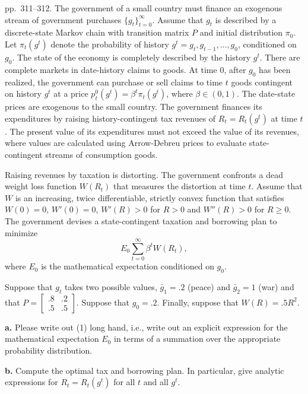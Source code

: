\documentclass[12pt, letterpaper]{article}
\begin{document}
\begin{tcolorbox}[evenbox,title={Exercise 8.8 \quad Optimal taxation}]
\begin{tcolorbox}[questionbox]
pp.~311--312. The government of a small country must finance an exogenous stream of government purchases
$\{g_t\}_{t=0}^\infty$. Assume that $g_t$ is described by a discrete-state Markov chain with transition matrix
$P$ and initial distribution $\pi_0$. Let $\pi_t(g^t)$ denote the probability of history
$g^t=g_t,g_{t-1},\dots,g_0$, conditioned on $g_0$. The state of the economy is completely described by the
history $g^t$. There are complete markets in date-history claims to goods. At time 0, after $g_0$ has been
realized, the government can purchase or sell claims to time $t$ goods contingent on history $g^t$ at a
price $p^0_t(g^t)=\beta^t\pi_t(g^t)$, where $\beta\in(0,1)$. The date-state prices are exogenous to the small
country. The government finances its expenditures by raising history-contingent tax revenues of
$R_t=R_t(g^t)$ at time $t$. The present value of its expenditures must not exceed the value of its revenues,
where values are calculated using Arrow-Debreu prices to evaluate state-contingent streams of consumption
goods.

Raising revenues by taxation is distorting. The government confronts a dead weight loss function
$W(R_t)$ that measures the distortion at time $t$. Assume that $W$ is an increasing, twice differentiable,
strictly convex function that satisfies $W(0)=0$, $W'(0)=0$, $W'(R)>0$ for $R>0$ and $W''(R)>0$ for
$R\ge0$. The government devises a state-contingent taxation and borrowing plan to minimize
\[
E_0\sum_{t=0}^\infty\beta^tW(R_t), \tag{1}
\]
where $E_0$ is the mathematical expectation conditioned on $g_0$.

Suppose that $g_t$ takes two possible values, $\bar g_1=.2$ (peace) and $\bar g_2=1$ (war) and that
$P=\begin{bmatrix}.8&.2\\.5&.5\end{bmatrix}$. Suppose that $g_0=.2$. Finally, suppose that $W(R)=.5R^2$.

\textbf{a.} Please write out (1) long hand, i.e., write out an explicit expression for the mathematical
expectation $E_0$ in terms of a summation over the appropriate probability distribution.

\textbf{b.} Compute the optimal tax and borrowing plan. In particular, give analytic expressions for
$R_t=R_t(g^t)$ for all $t$ and all $g^t$.


\end{tcolorbox}
\end{tcolorbox}
\end{document}
